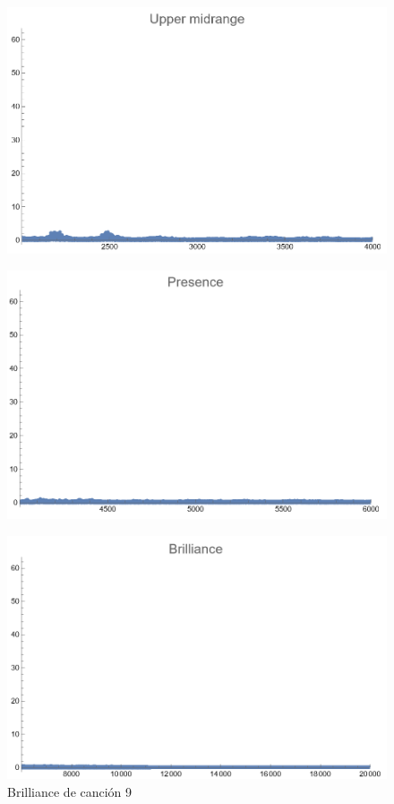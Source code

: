 \documentclass[12pt, letterpaper]{article}
\begin{document}
\begin{figure}[H]
  \centering
  \begin{minipage}{.5\textwidth}
    \centering
    \includegraphics[width=.9\linewidth]{imgs/Cancion9/upmid.png}
    \label{fig:09f}
  \end{minipage}%
  \begin{minipage}{.5\textwidth}
    \centering
    \includegraphics[width=.9\linewidth]{imgs/Cancion9/presence.png}
    \label{fig:09g}
  \end{minipage}
\end{figure}
\begin{figure}[H]
  \centering
  \includegraphics[width=.45\linewidth]{imgs/Cancion9/brilliance.png}
  \caption{Brilliance de canción 9}
  \label{fig:09h}
\end{figure}
\end{document}
